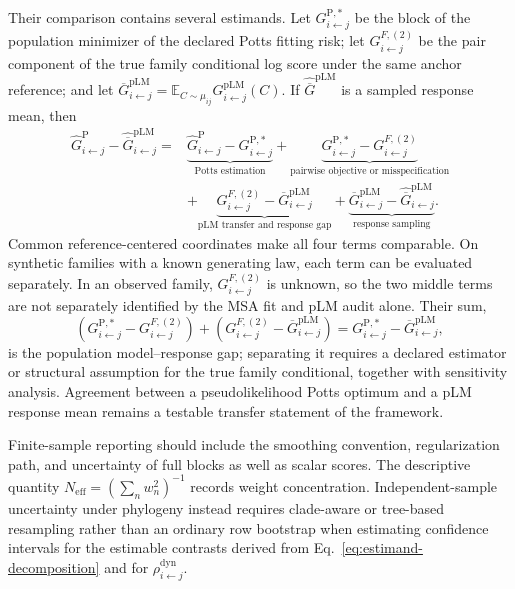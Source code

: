 \documentclass[10pt]{article}
\newcommand{\E}{\mathbb E}
\theoremstyle{definition}
\theoremstyle{remark}
\newcommand{\BookInsert}[1]{}
\begin{document}
Their comparison contains several estimands.  Let $G_{i\leftarrow j}^{\mathrm{P},*}$ be the block
of the population minimizer of the declared Potts fitting risk; let
$G_{i\leftarrow j}^{F,(2)}$ be the pair component of the true family conditional log score under
the same anchor reference; and let
$\overline G_{i\leftarrow j}^{\mathrm{pLM}}=
\E_{C\sim\mu_{ij}}G_{i\leftarrow j}^{\mathrm{pLM}}(C)$.  If
$\widehat{\overline G}^{\mathrm{pLM}}$ is a sampled response mean, then
\begin{align}
\widehat G_{i\leftarrow j}^{\mathrm P}
-\widehat{\overline G}_{i\leftarrow j}^{\mathrm{pLM}}
={}&\underbrace{\widehat G_{i\leftarrow j}^{\mathrm P}
-G_{i\leftarrow j}^{\mathrm{P},*}}_{\text{Potts estimation}}
+\underbrace{G_{i\leftarrow j}^{\mathrm{P},*}
-G_{i\leftarrow j}^{F,(2)}}_{\text{pairwise objective or misspecification}}\nonumber\\
&+\underbrace{G_{i\leftarrow j}^{F,(2)}
-\overline G_{i\leftarrow j}^{\mathrm{pLM}}}_{\text{pLM transfer and response gap}}
+\underbrace{\overline G_{i\leftarrow j}^{\mathrm{pLM}}
-\widehat{\overline G}_{i\leftarrow j}^{\mathrm{pLM}}}_{\text{response sampling}}.
\label{eq:estimand-decomposition}
\end{align}
Common reference-centered coordinates make all four terms comparable.  On synthetic families with
a known generating law, each term can be evaluated separately.  In an observed family,
$G_{i\leftarrow j}^{F,(2)}$ is unknown, so the two middle terms are not separately identified by the
MSA fit and pLM audit alone.  Their sum,
\[
\left(G_{i\leftarrow j}^{\mathrm{P},*}-G_{i\leftarrow j}^{F,(2)}\right)
+\left(G_{i\leftarrow j}^{F,(2)}-\overline G_{i\leftarrow j}^{\mathrm{pLM}}\right)
=G_{i\leftarrow j}^{\mathrm{P},*}-\overline G_{i\leftarrow j}^{\mathrm{pLM}},
\]
is the population model--response gap; separating it requires a declared estimator or structural
assumption for the true family conditional, together with sensitivity analysis.  Agreement between
a pseudolikelihood Potts optimum and a pLM response mean remains a testable transfer statement of
the framework.

\BookInsert{chapters/09_estimand_ledger}

Finite-sample reporting should include the smoothing convention, regularization path, and
uncertainty of full blocks as well as scalar scores.  The descriptive quantity
$N_{\mathrm{eff}}=(\sum_nw_n^2)^{-1}$ records weight concentration.  Independent-sample
uncertainty under phylogeny instead requires clade-aware or tree-based resampling rather than an
ordinary row bootstrap when estimating confidence intervals for the estimable contrasts derived
from Eq.~\ref{eq:estimand-decomposition} and for $\rho_{i\leftarrow j}^{\mathrm{dyn}}$.
\end{document}
